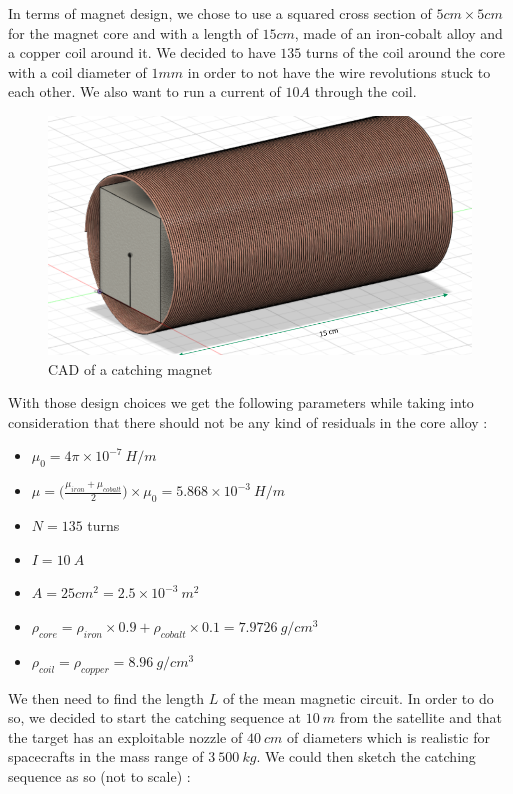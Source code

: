 In terms of magnet design, we chose to use a squared cross section of $5cm\times 5cm$ for the magnet core and with a length of $15cm$, made of an iron-cobalt alloy and a copper coil around it. We decided to have $135$ turns of the coil around the core with a coil diameter of $1mm$ in order to not have the wire revolutions stuck to each other. We also want to run a current of $10A$ through the coil.\\

\begin{figure}[H]
	\centering
	\includegraphics[width=\linewidth]{magnetCAD}
	\caption{CAD of a catching magnet}
\end{figure}


With those design choices we get the following parameters while taking into consideration that there should not be any kind of residuals in the core alloy :

\begin{itemize}
	\item $\mu_0 = 4\pi \times 10^{-7}\ H/m$
	\item $\mu = \bigg(\frac{\mu_{iron}+\mu_{cobalt}}{2}\bigg)\times\mu_0=5.868\times10^{-3}\ H/m$
	\item $N=135$ turns
	\item $I = 10\ A$
	\item $A = 25cm^2=2.5\times10^{-3}\ m^2$
	\item $\rho_{core} = \rho_{iron}\times 0.9 + \rho_{cobalt}\times0.1 = 7.9726\ g/cm^3$
	\item $\rho_{coil} = \rho_{copper} = 8.96\ g/cm^3$
\end{itemize}

We then need to find the length $L$ of the mean magnetic circuit. In order to do so, we decided to start the catching sequence at $10\ m$ from the satellite and that the target has an exploitable nozzle of $40\ cm$ of diameters which is realistic for spacecrafts in the mass range of $3\ 500\ kg$. We could then sketch the catching sequence as so (not to scale) :

